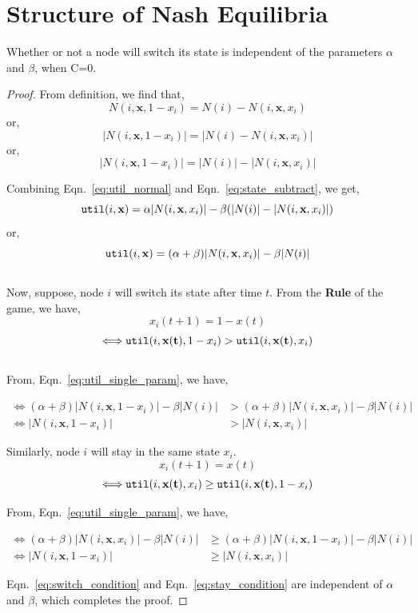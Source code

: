 
\section{Structure of Nash Equilibria}

\begin{lemma}
\label{lemma:alpha_beta_independence}
Whether or not a node will switch its state is independent of the parameters $\alpha$ and $\beta$, when C=0.

\begin{proof}
From definition, we find that,
$$N(i, \mathbf{x}, 1-x_i) = N(i) - N(i, \mathbf{x}, x_i)$$
or, $$|N(i, \mathbf{x}, 1-x_i)| = |N(i) - N(i, \mathbf{x}, x_i)|$$
or, 
\begin{equation}
\label{eq:state_subtract}
|N(i, \mathbf{x}, 1-x_i)| = |N(i)| - |N(i, \mathbf{x}, x_i)|
\end{equation}

Combining Eqn.~\ref{eq:util_normal} and Eqn.~\ref{eq:state_subtract}, we get,
$$
\texttt{util}(i, \mathbf{x})=\alpha|N(i, \mathbf{x}, x_i)| - \beta (|N(i)| - |N(i, \mathbf{x}, x_i)|)
$$
or,
\begin{equation}
\label{eq:util_single_param}
\texttt{util}(i, \mathbf{x})= (\alpha + \beta) |N(i, \mathbf{x}, x_i)| - \beta |N(i)|
\end{equation}\\
Now, suppose, node $i$ will switch its state after time $t$.
From the \textbf{Rule} of the game, we have,
$$x_i(t+1) = 1-x(t)$$
$$\Longleftrightarrow \texttt{util}(i, \mathbf{x(t)}, 1-x_i) > \texttt{util}(i, \mathbf{x(t)}, x_i)$$\\
From, Eqn.~\ref{eq:util_single_param}, we have,

\begin{align}
    \Longleftrightarrow (\alpha + \beta) |N(i, \mathbf{x}, 1-x_i)| - \beta |N(i)| &> (\alpha + \beta) |N(i, \mathbf{x}, x_i)| - \beta |N(i)|\\
    \Longleftrightarrow |N(i, \mathbf{x}, 1-x_i)| &>  |N(i, \mathbf{x}, x_i)|
\label{eq:switch_condition}
\end{align}

Similarly, node $i$ will stay in the same state $x_i$.
$$x_i(t+1) = x(t)$$
$$\Longleftrightarrow \texttt{util}(i, \mathbf{x(t)}, x_i) \geq \texttt{util}(i, \mathbf{x(t)}, 1-x_i)$$

From, Eqn.~\ref{eq:util_single_param}, we have,

\begin{align}
    \Longleftrightarrow (\alpha + \beta) |N(i, \mathbf{x}, x_i)| - \beta |N(i)| & \geq (\alpha + \beta) |N(i, \mathbf{x}, 1-x_i)| - \beta |N(i)|\\
    \Longleftrightarrow |N(i, \mathbf{x}, 1-x_i)| & \geq  |N(i, \mathbf{x}, x_i)|
\label{eq:stay_condition}
\end{align}

Eqn.~\ref{eq:switch_condition} and  Eqn.~\ref{eq:stay_condition} are independent of  $\alpha$ and $\beta$, which completes the proof.
\end{proof}
\end{lemma}





